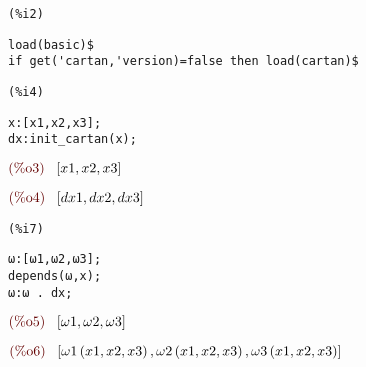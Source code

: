 \noindent
\begin{minipage}[t]{8ex}
\color{red}\bf
\begin{verbatim}
(%i2) 
\end{verbatim}
\end{minipage}
\begin{minipage}[t]{\textwidth}
\color{blue}
\begin{verbatim}
load(basic)$
if get('cartan,'version)=false then load(cartan)$
\end{verbatim}
\end{minipage}

\smallskip

\noindent
\begin{minipage}[t]{8ex}
\color{red}\bf
\begin{verbatim}
(%i4) 
\end{verbatim}
\end{minipage}
\begin{minipage}[t]{\textwidth}
\color{blue}
\begin{verbatim}
x:[x1,x2,x3];
dx:init_cartan(x);
\end{verbatim}
\end{minipage}
\begin{math}\displaystyle
\parbox{8ex}{\color{labelcolor}(\%o3) }
[x1,x2,x3]
\end{math}

\noindent
\begin{math}\displaystyle
\parbox{8ex}{\color{labelcolor}(\%o4) }
[dx1,dx2,dx3]
\end{math}


\noindent
\begin{minipage}[t]{8ex}
\color{red}\bf
\begin{verbatim}
(%i7) 
\end{verbatim}
\end{minipage}
\begin{minipage}[t]{\textwidth}
\color{blue}
\begin{verbatim}
ω:[ω1,ω2,ω3];
depends(ω,x);
ω:ω . dx;
\end{verbatim}
\end{minipage}
\begin{math}\displaystyle
\parbox{8ex}{\color{labelcolor}(\%o5) }
[\omega1,\omega2,\omega3]
\end{math}

\noindent
\begin{math}\displaystyle
\parbox{8ex}{\color{labelcolor}(\%o6) }
[\mathrm{\omega1}\left( x1,x2,x3\right) ,\mathrm{\omega2}\left( x1,x2,x3\right) ,\mathrm{\omega3}\left( x1,x2,x3\right) ]
\end{math}

